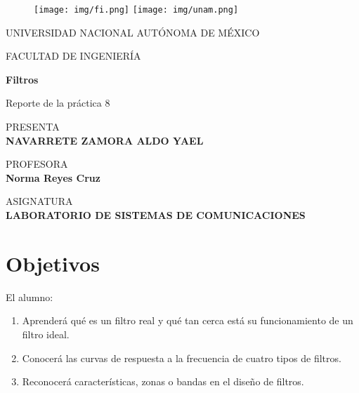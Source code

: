 \documentclass[12pt, a4paper]{article}
\begin{document}
\thispagestyle{empty}
	
\begin{figure}[ht]
		\texttt{[image: img/fi.png]}
		\label{EscudoUABC}
   \endminipage
		\texttt{[image: img/unam.png]}
		\label{EscudoFC}
	\endminipage
\end{figure}
	
\begin{center}
\vspace{0.8cm}
\LARGE
UNIVERSIDAD NACIONAL AUTÓNOMA DE MÉXICO

\vspace{0.8cm}
\LARGE
FACULTAD DE INGENIERÍA

\vspace{1.7cm}	
\Large
\textbf{Filtros}

\vspace{0.2cm}
\LARGE
Reporte de la práctica 8


\vspace{1.3cm}
\normalsize	
PRESENTA \\
\vspace{.3cm}
\large
\textbf{NAVARRETE ZAMORA ALDO YAEL}

\vspace{1.3cm}
\normalsize	
PROFESORA \\
\vspace{.3cm}
\large
\textbf{Norma Reyes Cruz}

\vspace{1.3cm}
\normalsize	
ASIGNATURA \\
\vspace{.3cm}
\large
\textbf{LABORATORIO DE SISTEMAS DE COMUNICACIONES}
\end{center}

\newpage



\section{Objetivos}

El alumno:
\begin{enumerate}
  \item Aprenderá qué es un filtro real y qué tan cerca está su funcionamiento de un filtro ideal.
  \item Conocerá las curvas de respuesta a la frecuencia de cuatro tipos de filtros.
  \item Reconocerá características, zonas o bandas en el diseño de filtros.
\end{enumerate}
\end{document}
